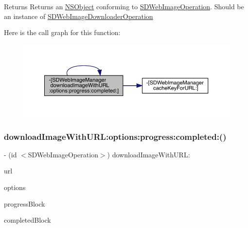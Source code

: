 \begin{DoxyReturn}{Returns}
Returns an \mbox{\hyperlink{class_n_s_object-p}{N\+S\+Object}} conforming to \mbox{\hyperlink{class_s_d_web_image_operation-p}{S\+D\+Web\+Image\+Operation}}. Should be an instance of \mbox{\hyperlink{interface_s_d_web_image_downloader_operation}{S\+D\+Web\+Image\+Downloader\+Operation}} 
\end{DoxyReturn}
Here is the call graph for this function\+:\nopagebreak
\begin{figure}[H]
\begin{center}
\leavevmode
\includegraphics[width=350pt]{interface_s_d_web_image_manager_ab094c361edd5ff886cbf484892e688be_cgraph}
\end{center}
\end{figure}
\mbox{\label{interface_s_d_web_image_manager_a975d3dc781fe58ad92f6a40d06c98f35}} 
\subsubsection{\texorpdfstring{download\+Image\+With\+U\+R\+L\+:options\+:progress\+:completed\+:()}{downloadImageWithURL:options:progress:completed:()}\hspace{0.1cm}{\footnotesize\ttfamily [2/3]}}
{\footnotesize\ttfamily -\/ (id $<$S\+D\+Web\+Image\+Operation$>$) download\+Image\+With\+U\+R\+L\+: \begin{DoxyParamCaption}\item[{(N\+S\+U\+RL $\ast$)}]{url }\item[{options:(S\+D\+Web\+Image\+Options)}]{options }\item[{progress:(S\+D\+Web\+Image\+Downloader\+Progress\+Block)}]{progress\+Block }\item[{completed:(S\+D\+Web\+Image\+Completion\+With\+Finished\+Block)}]{completed\+Block }\end{DoxyParamCaption}}

